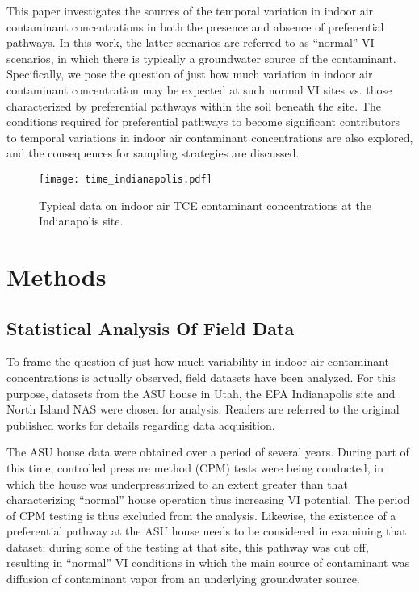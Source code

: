 \documentclass[journal=esthag,manuscript=article]{achemso}
\begin{document}
This paper investigates the sources of the temporal variation in indoor air contaminant concentrations in both the presence and absence of preferential pathways.
In this work, the latter scenarios are referred to as “normal” VI scenarios, in which there is typically a groundwater source of the contaminant.
Specifically, we pose the question of just how much variation in indoor air contaminant concentration may be expected at such normal VI sites vs. those characterized by preferential pathways within the soil beneath the site.
The conditions required for preferential pathways to become significant contributors to temporal variations in indoor air contaminant concentrations are also explored, and the consequences for sampling strategies are discussed.\par

\begin{figure}
 \caption{Typical data on indoor air TCE contaminant concentrations at the Indianapolis site\cite{u.s._environmental_protection_agency_assessment_2015}.}\label{fig:indianapolis}
 \texttt{[image: time\_indianapolis.pdf]}
\end{figure}

\section{Methods}

\subsection{Statistical Analysis Of Field Data}

To frame the question of just how much variability in indoor air contaminant concentrations is actually observed, field datasets have been analyzed.
For this purpose, datasets from the ASU house in Utah, the EPA Indianapolis site and North Island NAS were chosen for analysis.
Readers are referred to the original published works for details regarding data acquisition\cite{holton_evaluation_2015,guo_vapor_2015,holton_temporal_2013,hosangadi_high-frequency_2017,u.s._environmental_protection_agency_assessment_2015}.\par

The ASU house data were obtained over a period of several years.
During part of this time, controlled pressure method (CPM) tests were being conducted, in which the house was underpressurized to an extent greater than that characterizing “normal” house operation thus increasing VI potential\cite{mchugh_evaluation_2012,mchugh_recent_2017,holton_evaluation_2015}.
The period of CPM testing is thus excluded from the analysis.
Likewise, the existence of a preferential pathway at the ASU house needs to be considered in examining that dataset; during some of the testing at that site, this pathway was cut off, resulting in “normal” VI conditions in which the main source of contaminant was diffusion of contaminant vapor from an underlying groundwater source.\par
\end{document}
